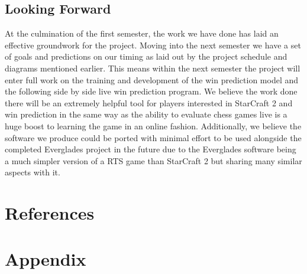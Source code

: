 \documentclass[a4paper,12pt]{report}
\begin{document}
\section{Looking Forward}
At the culmination of the first semester, the work we have done has laid an effective groundwork for the project. Moving into the next semester we have a set of goals and predictions on our timing as laid out by the project schedule and diagrams mentioned earlier. This means within the next semester the project will enter full work on the training and development of the win prediction model and the following side by side live win prediction program. We believe the work done there will be an extremely helpful tool for players interested in StarCraft 2 and win prediction in the same way as the ability to evaluate chess games live is a huge boost to learning the game in an online fashion. Additionally, we believe the software we produce could be ported with minimal effort to be used alongside the completed Everglades project in the future due to the Everglades software being a much simpler version of a RTS game than StarCraft 2 but sharing many similar aspects with it.

\chapter{References}
\chapter{Appendix}
\end{document}
